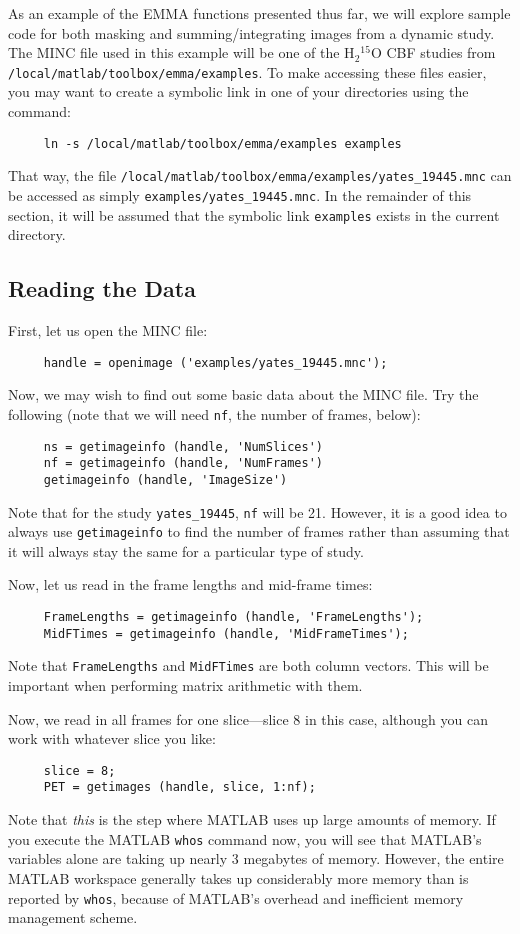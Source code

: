As an example of the EMMA functions presented thus far, we will
explore sample code for both masking and summing/integrating images
from a dynamic study.  The MINC file used in this example will be one
of the H$_2$$^{15}$O CBF studies from
\verb|/local/matlab/toolbox/emma/examples|.  To make accessing these
files easier, you may want to create a symbolic link in one of your
directories using the command:
\begin{verbatim}
     ln -s /local/matlab/toolbox/emma/examples examples
\end{verbatim}
That way, the file
\verb|/local/matlab/toolbox/emma/examples/yates_19445.mnc| can be
accessed as simply \verb|examples/yates_19445.mnc|.  In the remainder
of this section, it will be assumed that the symbolic link
\verb|examples| exists in the current directory.

\subsection{Reading the Data}

First, let us open the MINC file:
\begin{verbatim}
     handle = openimage ('examples/yates_19445.mnc');
\end{verbatim}
Now, we may wish to find out some basic data about the MINC file.  Try
the following (note that we will need \verb|nf|, the number of frames,
below):
\begin{verbatim}
     ns = getimageinfo (handle, 'NumSlices')
     nf = getimageinfo (handle, 'NumFrames')
     getimageinfo (handle, 'ImageSize')
\end{verbatim}
Note that for the study \verb|yates_19445|, \verb|nf| will be 21.
However, it is a good idea to always use \verb|getimageinfo| to find
the number of frames rather than assuming that it will always stay the
same for a particular type of study.

Now, let us read in the frame lengths and mid-frame times:
\begin{verbatim}
     FrameLengths = getimageinfo (handle, 'FrameLengths');
     MidFTimes = getimageinfo (handle, 'MidFrameTimes');
\end{verbatim}
Note that \verb|FrameLengths| and \verb|MidFTimes| are both column
vectors.  This will be important when performing matrix arithmetic
with them.

Now, we read in all frames for one slice---slice 8 in this case,
although you can work with whatever slice you like:
\begin{verbatim}
     slice = 8;
     PET = getimages (handle, slice, 1:nf);
\end{verbatim}
Note that {\em this} is the step where MATLAB uses up large amounts of
memory.  If you execute the MATLAB \verb|whos| command now, you will
see that MATLAB's variables alone are taking up nearly 3 megabytes of
memory.  However, the entire MATLAB workspace generally takes up
considerably more memory than is reported by \verb|whos|, because of
MATLAB's overhead and inefficient memory management scheme.

